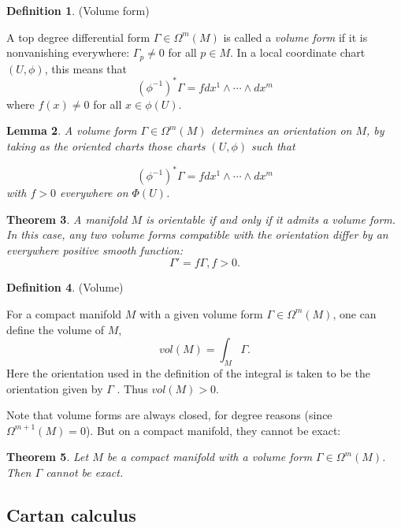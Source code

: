 \documentclass{article}
\newtheorem{theorem}{Theorem}[section]
\newtheorem{lemma}[theorem]{Lemma}
\theoremstyle{definition}
\newtheorem{defn}[theorem]{Definition}
\newenvironment{definition}
  {\vspace{8pt}\begin{mdframed}[backgroundcolor=blueish]\begin{defn}}
  {\end{defn}\end{mdframed}\vspace{4pt}}
\begin{document}
\begin{definition} (Volume form)

A top degree differential form $\Gamma \in \Omega^m(M)$ is called a \textit{volume form} if it is nonvanishing  everywhere: $\Gamma_p \neq 0$ for all $p \in M$. In a local coordinate chart $(U,\phi)$, this means that 
\[ (\phi^{-1} )^*\Gamma = f dx^1 \wedge \cdots \wedge dx^m 
\]
where $f(x) \neq 0$ for all $x \in  \phi(U)$.

\end{definition}


\begin{lemma}

A volume form $\Gamma \in \Omega^m(M)$ determines an orientation on $M$, by taking as the oriented charts those charts $(U,\phi)$ such that 

\[
    (\phi^{-1})^*\Gamma = f dx^1 \wedge \cdots \wedge dx^m
\]
with $f > 0$ everywhere on $\Phi(U)$.
\end{lemma}


\begin{theorem}

A manifold $M$ is orientable if and only if it admits a volume form. In this case, any two volume forms compatible with the orientation differ by an everywhere positive smooth function: 
\[
    \Gamma' = f \Gamma , f > 0.
\]

\end{theorem}

\begin{definition} (Volume)

For a compact manifold $M$ with a given volume form $\Gamma \in \Omega^m(M)$, one can define the volume of $M$, 
\[
vol(M) = \int_M \Gamma.
\]
Here the orientation used in the definition of the integral is taken to be the orientation given by $\Gamma$ . Thus $vol(M) > 0$.
\end{definition}

Note that volume forms are always closed, for degree reasons (since $\Omega^{m+1} (M) = 0$). But on a compact manifold, they cannot be exact:

\begin{theorem}

Let $M$ be a compact manifold with a volume form $\Gamma \in \Omega^m(M)$. Then $\Gamma$ cannot be exact.
\end{theorem}

\subsection{Cartan calculus}
\end{document}
